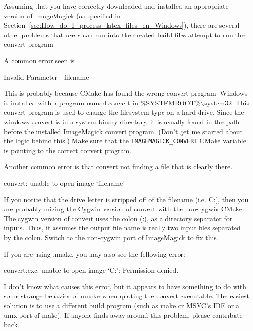 \documentclass{article}
\newcommand*{\textfile}[1]{\textsf{#1}}
\newcommand*{\textprog}[1]{\textfile{#1}}
\newcommand*{\textcmake}[1]{\texttt{#1}}
\newcommand*{\textcmakevar}[1]{\textcmake{#1}}
\begin{document}
  Assuming that you have correctly downloaded and installed an appropriate
  version of ImageMagick (as specified in
  Section~\ref{sec:How_do_I_process_latex_files_on_Windows}), there are several
  other problems that users can run into the created build files attempt to
  run the \textprog{convert} program.

  A common error seen is 

  \begin{CodeListing}
Invalid Parameter - filename
  \end{CodeListing}

  This is probably because CMake has found the wrong \textprog{convert}
  program. Windows is installed with a program named \textprog{convert} in
  \textfile{\%SYSTEMROOT\%$\backslash$system32}. This \textprog{convert}
  program is used to change the filesystem type on a hard drive. Since the
  windows \textfile{convert} is in a system binary directory, it is usually
  found in the path before the installed ImageMagick \textfile{convert}
  program. (Don't get me started about the logic behind this.) Make sure
  that the \textcmakevar{IMAGEMAGICK\_CONVERT} CMake variable is pointing
  to the correct \textprog{convert} program.

  Another common error is that \textprog{convert} not finding a file that
  is clearly there.

  \begin{CodeListing}
convert: unable to open image `filename'
  \end{CodeListing}

  If you notice that the drive letter is stripped off of the filename
  (i.e. \textfile{C:}), then you are probably mixing the Cygwin version of
  \textprog{convert} with the non-cygwin CMake. The cygwin version of
  \textprog{convert} uses the colon (:), as a directory separator for
  inputs. Thus, it assumes the output file name is really two input files
  separated by the colon. Switch to the non-cygwin port of ImageMagick to
  fix this.

  If you are using nmake, you may also see the following error: 

  \begin{CodeListing}
convert.exe: unable to open image `C:': Permission denied.
  \end{CodeListing}

  I don't know what causes this error, but it appears to have something to
  do with some strange behavior of nmake when quoting the convert
  executable. The easiest solution is to use a different build program
  (such as make or MSVC's IDE or a unix port of make). If anyone finds away
  around this problem, please contribute back.
\end{document}
